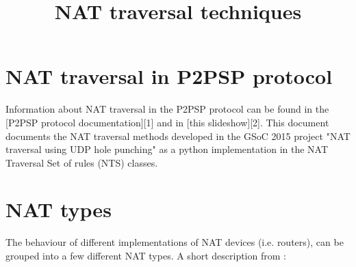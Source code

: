\documentclass{article}
\title{NAT traversal techniques}
\begin{document}
\maketitle

\section{NAT traversal in P2PSP protocol}

Information about NAT traversal in the P2PSP protocol can be found in
the [P2PSP protocol documentation][1] and in [this slideshow][2].
This document documents the NAT traversal methods developed in the
GSoC 2015 project "NAT traversal using UDP hole punching" as a python
implementation in the NAT Traversal Set of rules (NTS) classes.

\section{NAT types}

The behaviour of different implementations of NAT devices
(i.e. routers), can be grouped into a few different NAT types. A short
description from \cite{3}:
\end{document}
